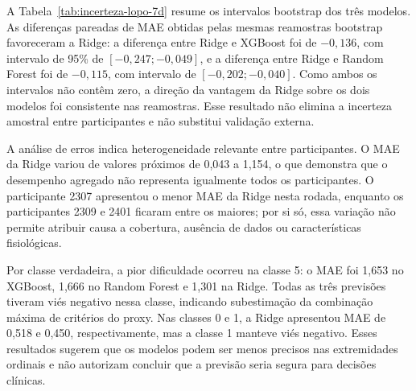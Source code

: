 \documentclass[12pt,a4paper]{article}
\begin{document}
A Tabela~\ref{tab:incerteza-lopo-7d} resume os intervalos bootstrap dos três
modelos. As diferenças pareadas de MAE obtidas pelas mesmas reamostras
bootstrap
favoreceram a Ridge: a diferença entre Ridge e XGBoost foi de
$-0,136$, com intervalo de 95\% de $[-0,247; -0,049]$, e a diferença entre
Ridge e Random Forest foi de $-0,115$, com intervalo de
$[-0,202; -0,040]$. Como ambos os intervalos não contêm zero, a direção da
vantagem da Ridge sobre os dois modelos foi consistente nas reamostras. Esse
resultado não elimina a incerteza amostral entre participantes e não substitui
validação externa.

A análise de erros indica heterogeneidade relevante entre participantes. O
MAE da Ridge variou de valores próximos de 0,043 a 1,154, o que demonstra que
o desempenho agregado não representa igualmente todos os participantes. O
participante 2307 apresentou o menor MAE da Ridge nesta rodada, enquanto os
participantes 2309 e 2401 ficaram entre os maiores; por si só, essa variação
não permite atribuir causa a cobertura, ausência de dados ou características
fisiológicas.

Por classe verdadeira, a pior dificuldade ocorreu na classe 5: o MAE foi
1,653 no XGBoost, 1,666 no Random Forest e 1,301 na Ridge. Todas as três
previsões tiveram viés negativo nessa classe, indicando subestimação da
combinação máxima de critérios do proxy. Nas classes 0 e 1, a Ridge apresentou
MAE de 0,518 e 0,450, respectivamente, mas a classe 1 manteve viés negativo.
Esses resultados sugerem que os modelos podem ser menos precisos nas extremidades
ordinais e não autorizam concluir que a previsão seria segura para decisões
clínicas.
\end{document}
